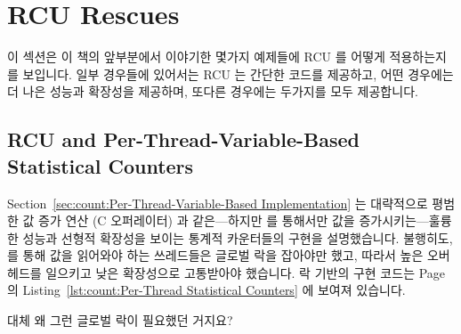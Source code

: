 
\section{RCU Rescues}
\label{sec:together:RCU Rescues}

이 섹션은 이 책의 앞부분에서 이야기한 몇가지 예제들에 RCU 를 어떻게
적용하는지를 보입니다.
일부 경우들에 있어서는 RCU 는 간단한 코드를 제공하고, 어떤 경우에는 더 나은
성능과 확장성을 제공하며, 또다른 경우에는 두가지를 모두 제공합니다.
\iffalse

This section shows how to apply RCU to some examples discussed earlier
in this book.
In some cases, RCU provides simpler code, in other cases better
performance and scalability, and in still other cases, both.
\fi

\subsection{RCU and Per-Thread-Variable-Based Statistical Counters}
\label{sec:together:RCU and Per-Thread-Variable-Based Statistical Counters}

Section~\ref{sec:count:Per-Thread-Variable-Based Implementation}
는 대략적으로 평범한 값 증가 연산 (C \co{++} 오퍼레이터) 과 같은---하지만
를 통해서만 값을 증가시키는---훌륭한 성능과 선형적 확장성을
보이는 통계적 카운터들의 구현을 설명했습니다.
불행히도,  를 통해 값을 읽어와야 하는 쓰레드들은 글로벌 락을 잡아야만 했고, 따라서 높은 오버헤드를 일으키고 낮은 확장성으로 고통받아야 했습니다.
락 기반의 구현 코드는
Page~\pageref{lst:count:Per-Thread Statistical Counters} 의
Listing~\ref{lst:count:Per-Thread Statistical Counters} 에 보여져 있습니다.
\iffalse

Section~\ref{sec:count:Per-Thread-Variable-Based Implementation}
described an implementation of statistical counters that provided
excellent
performance, roughly that of simple increment (as in the C \co{++}
operator), and linear scalability---but only for incrementing
via \co{inc_count()}.
Unfortunately, threads needing to read out the value via \co{read_count()}
were required to acquire a global
lock, and thus incurred high overhead and suffered poor scalability.
The code for the lock-based implementation is shown in
Listing~\ref{lst:count:Per-Thread Statistical Counters} on
Page~\pageref{lst:count:Per-Thread Statistical Counters}.
\fi

\QuickQuiz{}
	대체 왜 그런 글로벌 락이 필요했던 거지요?
	\iffalse

